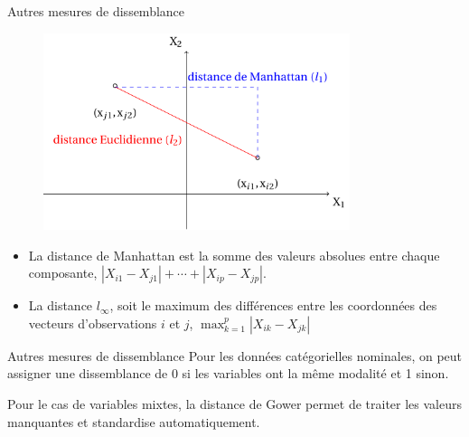 \documentclass[
  ignorenonframetext,
]{beamer}
\providecommand{\tightlist}{%
  \setlength{\itemsep}{0pt}\setlength{\parskip}{0pt}}\usepackage{longtable,booktabs,array}
\begin{document}
\begin{frame}{Autres mesures de dissemblance}
\protect\hypertarget{autres-mesures-de-dissemblance}{}
\begin{figure}

{\centering \includegraphics[width=0.8\textwidth,height=\textheight]{figures/distance.pdf}

}

\end{figure}

\begin{itemize}
\tightlist
\item
  La distance de Manhattan est la somme des valeurs absolues entre
  chaque composante, \(|X_{i1}-X_{j1}| + \cdots + |X_{ip}-X_{jp}|\).
\item
  La distance \(l_\infty\), soit le maximum des différences entre les
  coordonnées des vecteurs d'observations \(i\) et \(j\),
  \(\max_{k=1}^p |X_{ik}-X_{jk}|\)
\end{itemize}
\end{frame}

\begin{frame}{Autres mesures de dissemblance}
\protect\hypertarget{autres-mesures-de-dissemblance-1}{}
Pour les données catégorielles nominales, on peut assigner une
dissemblance de 0 si les variables ont la même modalité et 1 sinon.

Pour le cas de variables mixtes, la distance de Gower permet de traiter
les valeurs manquantes et standardise automatiquement.
\end{frame}
\end{document}

